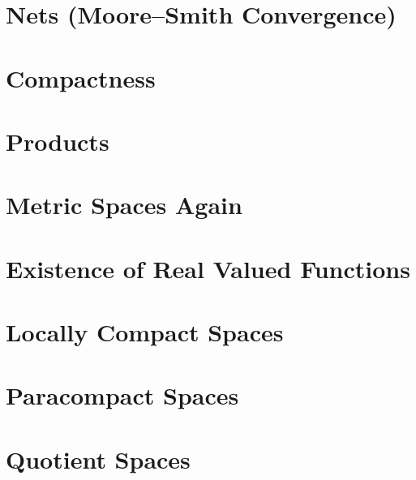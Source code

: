 \section{Nets (Moore--Smith Convergence)}





\section{Compactness}




\section{Products}
\addtocounter{subsection}{1}

\addtocounter{subsection}{-2}

\addtocounter{subsection}{1}








\section{Metric Spaces Again}






\section{Existence of Real Valued Functions}



\section{Locally Compact Spaces}




\section{Paracompact Spaces}



\section{Quotient Spaces}


